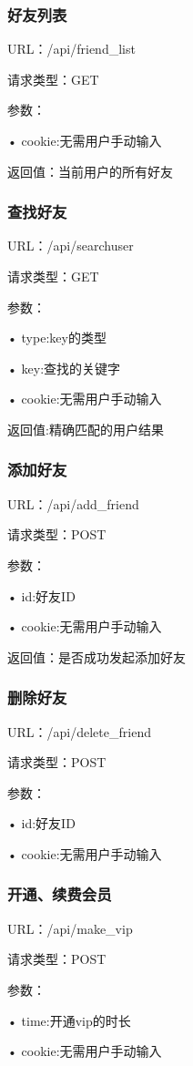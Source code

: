 {
\color{red}

\subsubsection{好友列表}
URL：/api/friend\_list

请求类型：GET

参数：

• cookie:无需用户手动输入

返回值：当前用户的所有好友

\subsubsection{查找好友}
URL：/api/searchuser

请求类型：GET

参数：

• type:key的类型

• key:查找的关键字

• cookie:无需用户手动输入

返回值:精确匹配的用户结果

\subsubsection{添加好友}
URL：/api/add\_friend

请求类型：POST

参数：

• id:好友ID

• cookie:无需用户手动输入

返回值：是否成功发起添加好友

\subsubsection{删除好友}
URL：/api/delete\_friend

请求类型：POST

参数：

• id:好友ID

• cookie:无需用户手动输入

\subsubsection{开通、续费会员}
URL：/api/make\_vip

请求类型：POST

参数：

• time:开通vip的时长

• cookie:无需用户手动输入

}


